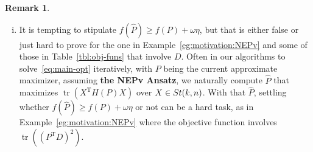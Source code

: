 \documentclass[11pt]{article}
\def\bbP{\mathbb{P}}
\def\wtd{\widetilde}
\def\what{\widehat}
\newcommand\STM[2]{{\rm St}(#1,#2)}
\DeclareMathOperator{\tr}{tr}
\DeclareMathOperator{\T}{T}
\theoremstyle{definition}
\newtheorem{remark}{Remark}[section]
\numberwithin{equation}{section}
\begin{document}
\begin{remark}
\begin{enumerate}[(i)]
        The comments in Remark~\ref{rk:NPDo-assume}(ii) on $\bbP$ apply here, too.

  \item It is tempting to stipulate  $f(\what P)\ge f(P)+\omega\eta$, but that is either false or just hard to prove
        for the one in Example~\ref{eg:motivation:NEPv} and some of those in Table~\ref{tbl:obj-funs} that involve $D$. Often in our algorithms to solve~\eqref{eq:main-opt} iteratively, with $P$ being
        the current approximate maximizer, assuming {\bf the NEPv Ansatz}, we naturally
        compute $\what P$ that maximizes $\tr(X^{\T}H(P)X)$ over $X\in\STM{k}{n}$. With that $\what P$, settling
        whether $f(\what P)\ge f(P)+\omega\eta$ or not can be a hard task, as
        in Example~\ref{eg:motivation:NEPv}
        where the objective function involves
        $\tr((P^{\T}D)^2)$.
\end{enumerate}
\end{remark}
\end{document}
